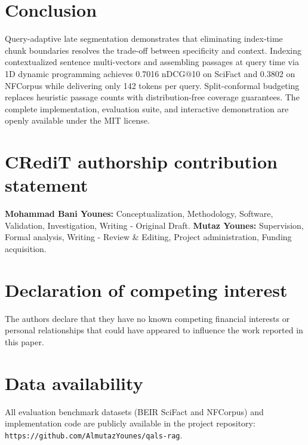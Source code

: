 \documentclass[preprint,12pt]{article}
\begin{document}
\section{Conclusion}
Query-adaptive late segmentation demonstrates that eliminating index-time chunk boundaries resolves the trade-off between specificity and context. Indexing contextualized sentence multi-vectors and assembling passages at query time via 1D dynamic programming achieves 0.7016 nDCG@10 on SciFact and 0.3802 on NFCorpus while delivering only 142 tokens per query. Split-conformal budgeting replaces heuristic passage counts with distribution-free coverage guarantees. The complete implementation, evaluation suite, and interactive demonstration are openly available under the MIT license.

\section*{CRediT authorship contribution statement}
\textbf{Mohammad Bani Younes:} Conceptualization, Methodology, Software, Validation, Investigation, Writing - Original Draft.
\textbf{Mutaz Younes:} Supervision, Formal analysis, Writing - Review \& Editing, Project administration, Funding acquisition.

\section*{Declaration of competing interest}
The authors declare that they have no known competing financial interests or personal relationships that could have appeared to influence the work reported in this paper.

\section*{Data availability}
All evaluation benchmark datasets (BEIR SciFact and NFCorpus) and implementation code are publicly available in the project repository: \texttt{https://github.com/AlmutazYounes/qals-rag}.
\end{document}

